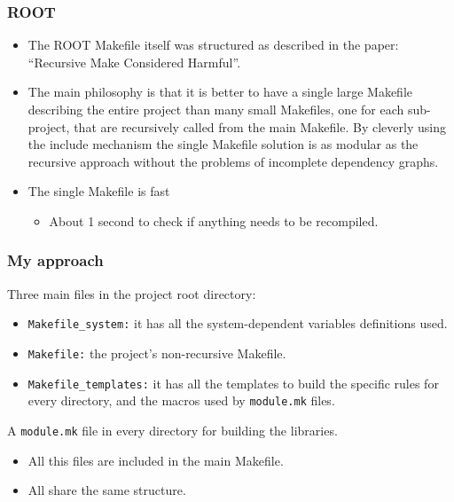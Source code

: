 \documentclass[11pt]{beamer}
\begin{document}
\begin{frame}
  \frametitle{ROOT}
  \begin{itemize}
    \item The ROOT Makefile itself was structured as described in the paper:
      ``Recursive Make Considered Harmful''.\\[5mm]
    \item The main philosophy is that it is better to have a single large
      Makefile describing the entire project than many small Makefiles, one
      for each sub-project, that are recursively called from the main
      Makefile. By cleverly using the include mechanism the single Makefile
      solution is as modular as the recursive approach without the problems of
      incomplete dependency graphs.\\[5mm]
    \item The single Makefile is fast
      \begin{itemize}
        \item About 1 second to check if anything needs to be recompiled.
      \end{itemize}
  \end{itemize}
\end{frame}


\begin{frame}
  \frametitle{My approach}
  Three main files in the project root directory:

  \begin{itemize}
    \item \texttt{Makefile\_system:} it has all the system-dependent variables
      definitions used.\\[2mm]
    \item \texttt{Makefile:} the project's non-recursive Makefile.\\[2mm]
    \item \texttt{Makefile\_templates:} it has all the templates to build the
      specific rules for every directory, and the macros used by
      \texttt{module.mk} files. 
  \end{itemize}
  
  \vspace{3mm}
  A \texttt{module.mk} file in every directory for building the libraries.

  \begin{itemize}
    \item All this files are included in the main Makefile.\\[2mm]
    \item All share the same structure.
  \end{itemize}
\end{frame}

\end{document}
